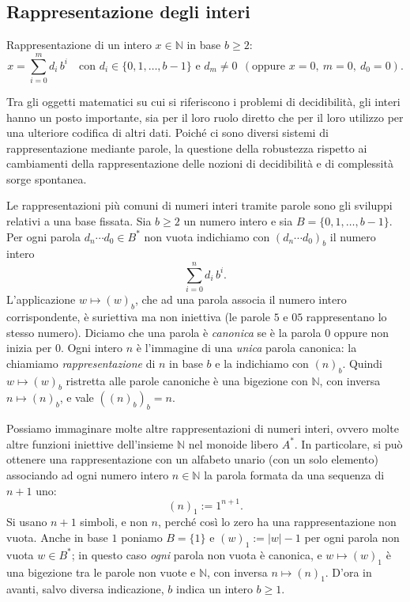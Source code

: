 \subsection{Rappresentazione degli interi}

Rappresentazione di un intero $x\in\mathbb{N}$ in base $b\geq 2$:
\[
x=\sum_{i=0}^{m}d_i\,b^i\quad\text{con } d_i\in\{0,1,\dots,b-1\}\text{ e } d_m\neq 0 \ \ (\text{oppure } x=0,\ m=0,\ d_0=0).
\]

Tra gli oggetti matematici su cui si riferiscono i problemi di decidibilità, gli interi hanno un posto importante, sia per il loro ruolo diretto che per il loro utilizzo per una ulteriore codifica di altri dati. Poiché ci sono diversi sistemi di rappresentazione mediante parole, la questione della robustezza rispetto ai cambiamenti della rappresentazione delle nozioni di decidibilità e di complessità sorge spontanea.

Le rappresentazioni più comuni di numeri interi tramite parole sono gli sviluppi relativi a una base fissata. Sia $b\geq 2$ un numero intero e sia $B=\{0,1,\dots,b-1\}$. Per ogni parola $d_n\cdots d_0\in B^*$ non vuota indichiamo con $(d_n\cdots d_0)_b$ il numero intero
\[
\sum_{i=0}^{n}d_i\,b^i .
\]
L'applicazione $w\mapsto (w)_b$, che ad una parola associa il numero intero corrispondente, è suriettiva ma non iniettiva (le parole $5$ e $05$ rappresentano lo stesso numero). Diciamo che una parola è \emph{canonica} se è la parola $0$ oppure non inizia per $0$. Ogni intero $n$ è l'immagine di una \emph{unica} parola canonica: la chiamiamo \emph{rappresentazione} di $n$ in base $b$ e la indichiamo con $(n)_b$. Quindi $w\mapsto (w)_b$ ristretta alle parole canoniche è una bigezione con $\mathbb{N}$, con inversa $n\mapsto (n)_b$, e vale $((n)_b)_b=n$.

Possiamo immaginare molte altre rappresentazioni di numeri interi, ovvero molte altre funzioni iniettive dell'insieme $\mathbb{N}$ nel monoide libero $A^*$. In particolare, si può ottenere una rappresentazione con un alfabeto unario (con un solo elemento) associando ad ogni numero intero $n\in\mathbb{N}$ la parola formata da una sequenza di $n+1$ uno:
\[
(n)_1:=1^{n+1}.
\]
Si usano $n+1$ simboli, e non $n$, perché così lo zero ha una rappresentazione non vuota. Anche in base $1$ poniamo $B=\{1\}$ e $(w)_1:=|w|-1$ per ogni parola non vuota $w\in B^*$; in questo caso \emph{ogni} parola non vuota è canonica, e $w\mapsto (w)_1$ è una bigezione tra le parole non vuote e $\mathbb{N}$, con inversa $n\mapsto (n)_1$. D'ora in avanti, salvo diversa indicazione, $b$ indica un intero $b\geq 1$.


